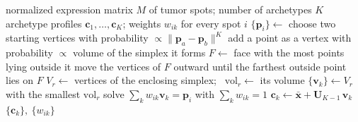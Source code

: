 \documentclass[11pt]{article}
\begin{document}
\begin{algorithm}[h]
\caption{\textbf{Simplex fitting in UNMIX.} Fits a simplex around the tumor spots in principal component space and expresses each spot as a convex combination of its vertices (the archetypes).}
\begin{algorithmic}
\Require normalized expression matrix $M$ of tumor spots; number of archetypes $K$
\Ensure archetype profiles $\mathbf{c}_1,\dots,\mathbf{c}_K$; weights $w_{ik}$ for every spot $i$
  \State $\{\mathbf{p}_i\} \gets$  
   
    \State choose two starting vertices with probability $\propto \lVert \mathbf{p}_a-\mathbf{p}_b\rVert^{K}$
      \State add a point as a vertex with probability $\propto$ volume of the simplex it forms
    \EndWhile
      \State $F \gets$ face with the most points lying outside it
      \State move the vertices of $F$ outward until the farthest outside point lies on $F$
    \EndWhile
    \State $V_r \gets$ vertices of the enclosing simplex; \ $\mathrm{vol}_r \gets$ its volume
  \EndFor
  \State $\{\mathbf{v}_k\} \gets V_r$ with the smallest $\mathrm{vol}_r$
    \State solve $\sum_{k} w_{ik}\mathbf{v}_k = \mathbf{p}_i$ with $\sum_{k} w_{ik} = 1$ 
  \EndFor
    \State $\mathbf{c}_k \gets \bar{\mathbf{x}} + \mathbf{U}_{K-1}\,\mathbf{v}_k$ 
  \EndFor
  \State \Return $\{\mathbf{c}_k\},\ \{w_{ik}\}$
\EndFunction
\end{algorithmic}
\end{algorithm}
\end{document}
